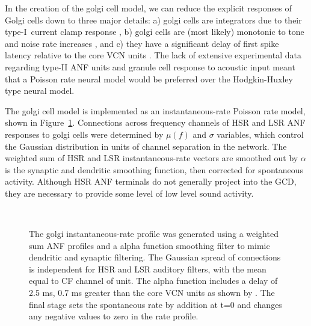 In the creation of the golgi cell model, we can reduce the explicit responses of
Golgi cells down to three major details: a) golgi cells are integrators due to
their type-I~current clamp response \citep{FerragamoGoldingEtAl:1998}, b) golgi
cells are (most likely) monotonic to tone and noise rate increases
\citep{GhoshalKim:1997}, and c) they have a significant delay of first spike
latency relative to the core VCN units \citep{GhoshalKim:1997}. The lack of
extensive experimental data regarding type-II ANF units and granule cell
response to acoustic input meant that a Poisson rate neural model would be
preferred over the Hodgkin-Huxley type neural model.

\medskip{}

The golgi cell model is implemented as an instantaneous-rate Poisson rate model,
shown in Figure~\ref{fig:GolgiDiagram}. Connections across frequency channels of
HSR and LSR ANF responses to golgi cells were determined by $\mu(f)$ and
$\sigma$ variables, which control the Gaussian distribution in units of channel
separation in the network. The weighted sum of HSR and LSR instantaneous-rate
vectors are smoothed out by $\alpha$ is the synaptic and dendritic smoothing
function, then corrected for spontaneous activity.  Although HSR ANF terminals do not generally project into the GCD, they are necessary to provide some level of low level sound activity.

 \begin{figure}[h!]
   \centering
  \\
  \caption{The golgi instantaneous-rate profile was generated using a weighted sum ANF
     profiles and a alpha function smoothing filter to mimic dendritic and synaptic filtering. The Gaussian spread of connections is independent for HSR and LSR auditory filters, with the mean equal to CF channel of unit. The alpha function includes a delay of 2.5 ms, 0.7 ms greater than the core VCN units as shown by \citet{GhoshalKim:1997}. The final stage sets the spontaneous rate by addition at t=0 and changes any negative values to zero in the rate profile.  
}\label{fig:GolgiDiagram}
 \end{figure}

